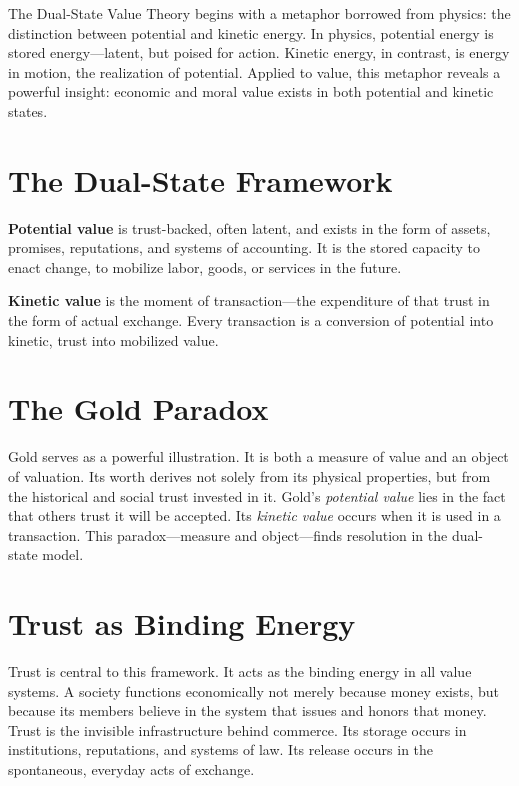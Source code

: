 \documentclass[11pt,oneside]{book}
\begin{document}
The Dual-State Value Theory begins with a metaphor borrowed from physics: the distinction between potential and kinetic energy. In physics, potential energy is stored energy—latent, but poised for action. Kinetic energy, in contrast, is energy in motion, the realization of potential. Applied to value, this metaphor reveals a powerful insight: economic and moral value exists in both potential and kinetic states.

\section{The Dual-State Framework}

\textbf{Potential value} is trust-backed, often latent, and exists in the form of assets, promises, reputations, and systems of accounting. It is the stored capacity to enact change, to mobilize labor, goods, or services in the future. 

\textbf{Kinetic value} is the moment of transaction—the expenditure of that trust in the form of actual exchange. Every transaction is a conversion of potential into kinetic, trust into mobilized value.

\section{The Gold Paradox}

Gold serves as a powerful illustration. It is both a measure of value and an object of valuation. Its worth derives not solely from its physical properties, but from the historical and social trust invested in it. Gold's \textit{potential value} lies in the fact that others trust it will be accepted. Its \textit{kinetic value} occurs when it is used in a transaction. This paradox—measure and object—finds resolution in the dual-state model.

\section{Trust as Binding Energy}

Trust is central to this framework. It acts as the binding energy in all value systems. A society functions economically not merely because money exists, but because its members believe in the system that issues and honors that money. Trust is the invisible infrastructure behind commerce. Its storage occurs in institutions, reputations, and systems of law. Its release occurs in the spontaneous, everyday acts of exchange.
\end{document}
